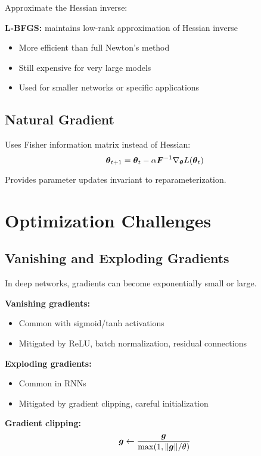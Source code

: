 Approximate the Hessian inverse:

\textbf{L-BFGS:} maintains low-rank approximation of Hessian inverse
\begin{itemize}
    \item More efficient than full Newton's method
    \item Still expensive for very large models
    \item Used for smaller networks or specific applications
\end{itemize}

\subsection{Natural Gradient}

Uses Fisher information matrix instead of Hessian:
\begin{equation}
\boldsymbol{\theta}_{t+1} = \boldsymbol{\theta}_t - \alpha \boldsymbol{F}^{-1} \nabla_{\boldsymbol{\theta}} L(\boldsymbol{\theta}_t)
\end{equation}

Provides parameter updates invariant to reparameterization.

\section{Optimization Challenges}
\label{sec:challenges}

\subsection{Vanishing and Exploding Gradients}

In deep networks, gradients can become exponentially small or large.

\textbf{Vanishing gradients:}
\begin{itemize}
    \item Common with sigmoid/tanh activations
    \item Mitigated by ReLU, batch normalization, residual connections
\end{itemize}

\textbf{Exploding gradients:}
\begin{itemize}
    \item Common in RNNs
    \item Mitigated by gradient clipping, careful initialization
\end{itemize}

\textbf{Gradient clipping:}
\begin{equation}
\boldsymbol{g} \leftarrow \frac{\boldsymbol{g}}{\max(1, \|\boldsymbol{g}\| / \theta)}
\end{equation}

